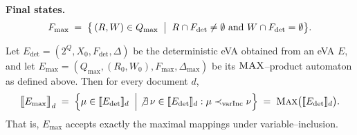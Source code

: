 \medskip
\noindent
\textbf{Final states.}
$$
  F_{\max}
  \;=\;
  \bigl\{\, (R,W)\in Q_{\max}\;\bigm|\;
           R\cap F_{\det}\neq\emptyset \text{ and }
           W\cap F_{\det}= \emptyset \bigr\}.
$$

\begin{proposition}\label{prop:myproposition}
	Let \(E_{\det}=(2^{Q},X_{0},F_{\det},\Delta)\) be the deterministic eVA
	obtained from an eVA \(E\), and let
	\(E_{\max}=(Q_{\max},(R_{0},W_{0}),F_{\max},\Delta_{\max})\) be its
	\(\textsc{MAX}\)–product automaton as defined above.  Then for every
	document \(d\),
	\[
	\bigl\llbracket E_{\max}\bigr\rrbracket_{d}
	\;=\;
	\Bigl\{
	\mu \in \llbracket E_{\det}\rrbracket_{d}
	\;\Bigm|\;
	\not\exists\,\nu\in\llbracket E_{\det}\rrbracket_{d}:
	\mu \prec_{\mathrm{varInc}}\nu
	\Bigr\}
	\;=\;
	\textsc{Max}\bigl(\llbracket E_{\det}\rrbracket_{d}\bigr).
	\]
	That is, \(E_{\max}\) accepts exactly the maximal mappings under
	variable–inclusion.
\end{proposition}



